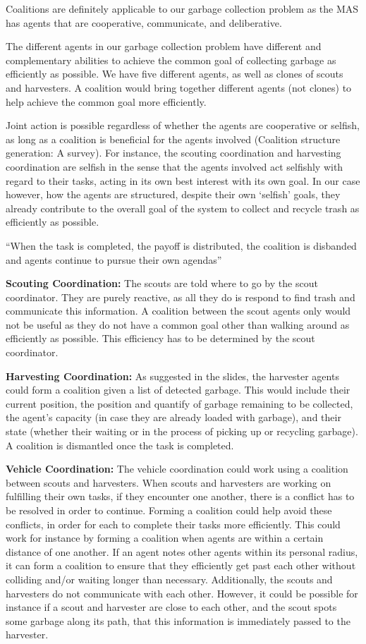 Coalitions are definitely applicable to our garbage collection problem as the MAS has agents that are cooperative, communicate, and deliberative.
 
The different agents in our garbage collection problem have different and complementary abilities to achieve the common goal of collecting garbage as efficiently as possible. We have five different agents, as well as clones of scouts and harvesters. A coalition would bring together different agents (not clones) to help achieve the common goal more efficiently.
 
Joint action is possible regardless of whether the agents are cooperative or selfish, as long as a coalition is beneficial for the agents involved (Coalition structure generation: A survey).  For instance, the scouting coordination and harvesting coordination are selfish in the sense that the agents involved act selfishly with regard to their tasks, acting in its own best interest with its own goal. In our case however, how the agents are structured, despite their own ‘selfish’ goals, they already contribute to the overall goal of the system to collect and recycle trash as efficiently as possible.
 
``When the task is completed, the payoff is distributed, the coalition is disbanded and agents continue to pursue their own agendas''

\textbf{Scouting Coordination:} The scouts are told where to go by the scout coordinator. They are purely reactive, as all they do is respond to find trash and communicate this information. A coalition between the scout agents only would not be useful as they do not have a common goal other than walking around as efficiently as possible. This efficiency has to be determined by the scout coordinator.  

\textbf{Harvesting Coordination:} As suggested in the slides, the harvester agents could form a coalition given a list of detected garbage. This would include their current position, the position and quantify of garbage remaining to be collected, the agent’s capacity (in case they are already loaded with garbage), and their state (whether their waiting or in the process of picking up or recycling garbage). A coalition is dismantled once the task is completed.

\textbf{Vehicle Coordination:} The vehicle coordination could work using a coalition between scouts and harvesters. When scouts and harvesters are working on fulfilling their own tasks, if they encounter one another, there is a conflict has to be resolved in order to continue. Forming a coalition could help avoid these conflicts, in order for each to complete their tasks more efficiently. This could work for instance by forming a coalition when agents are within a certain distance of one another. If an agent notes other agents within its personal radius, it can form a coalition to ensure that they efficiently get past each other without colliding and/or waiting longer than necessary. Additionally, the scouts and harvesters do not communicate with each other. However, it could be possible for instance if a scout and harvester are close to each other, and the scout spots some garbage along its path, that this information is immediately passed to the harvester. 

